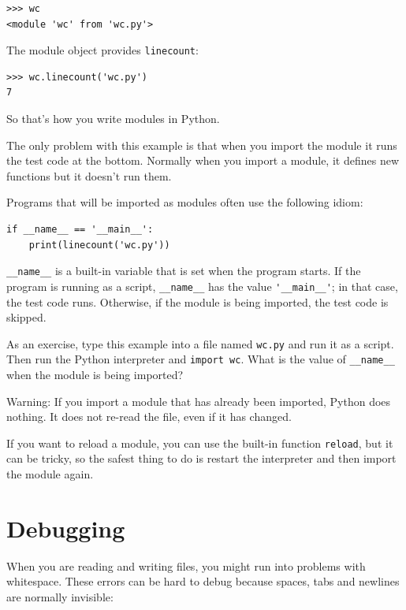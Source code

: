 \documentclass[10pt]{book}
\begin{document}
\begin{verbatim}
>>> wc
<module 'wc' from 'wc.py'>
\end{verbatim}
%
The module object provides \verb"linecount":

\begin{verbatim}
>>> wc.linecount('wc.py')
7
\end{verbatim}
%
So that's how you write modules in Python.

The only problem with this example is that when you import
the module it runs the test code at the bottom.  Normally
when you import a module, it defines new functions but it
doesn't run them.

Programs that will be imported as modules often
use the following idiom:

\begin{verbatim}
if __name__ == '__main__':
    print(linecount('wc.py'))
\end{verbatim}
%
\verb"__name__" is a built-in variable that is set when the
program starts.  If the program is running as a script,
\verb"__name__" has the value \verb"'__main__'"; in that
case, the test code runs.  Otherwise,
if the module is being imported, the test code is skipped.


As an exercise, type this example into a file named {\tt wc.py} and run
it as a script.  Then run the Python interpreter and
{\tt import wc}.  What is the value of \verb"__name__"
when the module is being imported?

Warning: If you import a module that has already been imported,
Python does nothing.  It does not re-read the file, even if it has
changed.

If you want to reload a module, you can use the built-in function
{\tt reload}, but it can be tricky, so the safest thing to do is
restart the interpreter and then import the module again.


\section{Debugging}

When you are reading and writing files, you might run into problems
with whitespace.  These errors can be hard to debug because spaces,
tabs and newlines are normally invisible:
\end{document}
